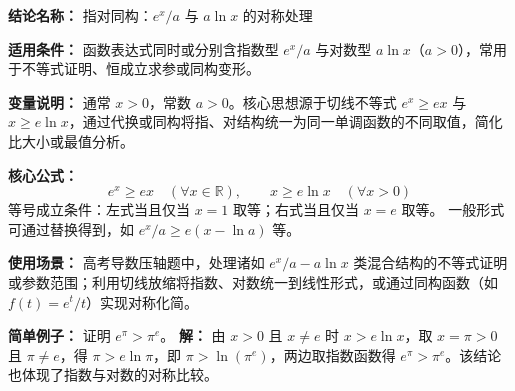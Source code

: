\textbf{结论名称：} 指对同构：\(e^x/a\) 与 \(a\ln x\) 的对称处理

\textbf{适用条件：} 函数表达式同时或分别含指数型 \(e^x/a\) 与对数型 \(a\ln x\)（\(a>0\)），常用于不等式证明、恒成立求参或同构变形。

\textbf{变量说明：} 通常 \(x>0\)，常数 \(a>0\)。核心思想源于切线不等式 \(e^x\ge ex\) 与 \(x\ge e\ln x\)，通过代换或同构将指、对结构统一为同一单调函数的不同取值，简化比大小或最值分析。

\textbf{核心公式：}
\[
\boxed{e^x \ge e x \quad (\forall x\in\mathbb{R}),\qquad x \ge e\ln x \quad (\forall x>0)}
\]
等号成立条件：左式当且仅当 \(x=1\) 取等；右式当且仅当 \(x=e\) 取等。  
一般形式可通过替换得到，如 \(e^{x}/a \ge e(x-\ln a)\) 等。

\textbf{使用场景：} 高考导数压轴题中，处理诸如 \(e^x/a - a\ln x\) 类混合结构的不等式证明或参数范围；利用切线放缩将指数、对数统一到线性形式，或通过同构函数（如 \(f(t)=e^t/t\)）实现对称化简。

\textbf{简单例子：}  
证明 \(e^{\pi} > \pi^{e}\)。  
\textbf{解：} 由 \(x>0\) 且 \(x\neq e\) 时 \(x > e\ln x\)，取 \(x=\pi>0\) 且 \(\pi\neq e\)，得 \(\pi > e\ln \pi\)，即 \(\pi > \ln(\pi^{e})\)，两边取指数函数得 \(e^{\pi} > \pi^{e}\)。该结论也体现了指数与对数的对称比较。